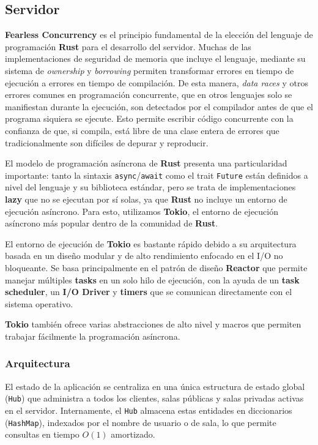 \subsection*{Servidor}

\textbf{Fearless Concurrency} es el principio fundamental de la elección del lenguaje de programación
\textbf{Rust} para el desarrollo del servidor. Muchas de las implementaciones de seguridad de memoria
que incluye el lenguaje, mediante su sistema de \textit{ownership} y \textit{borrowing} permiten transformar 
errores en tiempo de ejecución a errores en tiempo de compilación. De esta manera, \textit{data races} y 
otros errores comunes en programación concurrente, que en otros lenguajes solo se manifiestan durante la ejecución,
son detectados por el compilador antes de que el programa siquiera se ejecute. Esto permite escribir código
concurrente con la confianza de que, si compila, está libre de una clase entera de errores que tradicionalmente son 
difíciles de depurar y reproducir.

El modelo de programación asíncrona de \textbf{Rust} presenta una particularidad importante:
tanto la sintaxis \texttt{async}/\texttt{await} como el trait \texttt{Future} están definidos
a nivel del lenguaje y su biblioteca estándar, pero se trata de implementaciones \textbf{lazy}
que no se ejecutan por sí solas, ya que \textbf{Rust} no incluye un entorno de ejecución asíncrono.
Para esto, utilizamos \textbf{Tokio}, el entorno de ejecución asíncrono más popular dentro de la 
comunidad de \textbf{Rust}. 

El entorno de ejecución de \textbf{Tokio} es bastante rápido debido a su arquitectura basada en un diseño
modular y de alto rendimiento enfocado en el I/O no bloqueante. Se basa principalmente en el patrón de diseño
\textbf{Reactor} que permite manejar múltiples \textbf{tasks} en un solo hilo de ejecución, con la ayuda de un 
\textbf{task scheduler}, un \textbf{I/O Driver} y \textbf{timers} que se comunican directamente con el sistema
operativo. 

\textbf{Tokio} también ofrece varias abstracciones de alto nivel y macros que permiten trabajar fácilmente la programación
asíncrona.

\subsubsection*{Arquitectura}

El estado de la aplicación se centraliza en una única estructura de estado global (\texttt{Hub})
que administra a todos los clientes, salas públicas y salas privadas activas en el servidor.
Internamente, el \texttt{Hub} almacena estas entidades en diccionarios (\texttt{HashMap}),
indexados por el nombre de usuario o de sala, lo que permite consultas en tiempo $O(1)$ amortizado.

